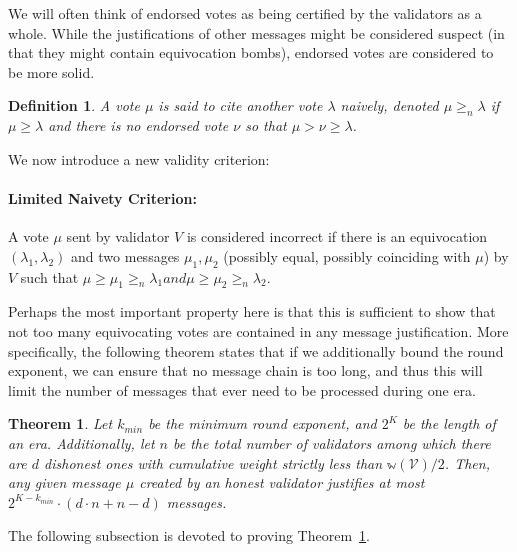 \documentclass[12pt, fleqn]{article}
\newtheorem{proposition}{Proposition}
\newtheorem{theorem}{Theorem}
\newtheorem{definition}{Definition}
\newcommand{\ww}{\mathbb{w}}
\begin{document}
We will often think of endorsed votes as being certified by the validators as a whole. While the justifications of other messages might be considered suspect (in that they might contain equivocation bombs), endorsed votes are considered to be more solid.
\begin{definition}
A vote $\mu$ is said to cite another vote $\lambda$ \emph{naively}, denoted $\mu \geq_n \lambda$ if $\mu \geq \lambda$ and there is no endorsed vote $\nu$ so that $\mu > \nu \geq \lambda$.
\end{definition}

We now introduce a new validity criterion:

\paragraph{Limited Naivety Criterion:} A vote $\mu$ sent by validator $V$ is considered incorrect if there is an equivocation $(\lambda_1, \lambda_2)$ and two messages $\mu_1, \mu_2$ (possibly equal, possibly coinciding with $\mu$) by $V$ such that $\mu \geq \mu_1 \geq_n \lambda_1 and \mu \geq \mu_2 \geq_n \lambda_2$.

Perhaps the most important property here is that this is sufficient to show that not too many equivocating votes are contained in any message justification.
% 
More specifically, the following theorem states that if we additionally bound the round exponent, we can ensure that no message chain is too long, and thus this will limit the number of messages that ever need to be processed during one era.

\begin{theorem}\label{thm:limit_spam}
Let $k_{min}$ be the minimum round exponent, and $2^K$ be the length of an era. Additionally, let $n$ be the total number of validators among which there are $d$ dishonest ones with cumulative weight strictly less than $\ww(\mathcal{V})/2$. Then, any given message $\mu$ created by an honest validator justifies at most $2^{K-k_{min}}\cdot (d\cdot n + n-d)$ messages.
\end{theorem}
\noindent 
The following subsection is devoted to proving Theorem~\ref{thm:limit_spam}.


\end{document}
